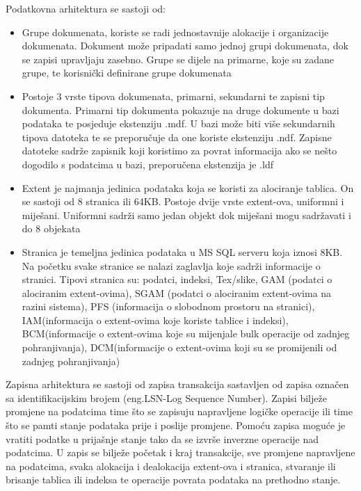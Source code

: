 \documentclass[12pt, oneside, onecolumn]{book}
\begin{document}
{Podatkovna arhitektura se sastoji od:

\begin{itemize}
\item Grupe dokumenata, koriste se radi jednostavnije alokacije i organizacije dokumenata. Dokument može pripadati samo jednoj grupi dokumenata, dok se zapisi upravljaju zasebno. Grupe se dijele na primarne, koje su zadane grupe, te korisnički definirane grupe dokumenata
\item Postoje 3 vrste tipova dokumenata, primarni, sekundarni te zapisni tip dokumenta. Primarni tip dokumenta pokazuje na druge dokumente u bazi podataka te posjeduje ekstenziju .mdf. U bazi može biti više sekundarnih tipova datoteka te se preporučuje da one koriste ekstenziju .ndf. Zapisne datoteke sadrže zapisnik koji koristimo za povrat informacija ako se nešto dogodilo s podatcima u bazi, preporučena ekstenzija je .ldf
\item Extent je najmanja jedinica podataka koja se koristi za alociranje tablica. On se sastoji od 8 stranica ili 64KB. Postoje dvije vrste extent-ova, uniformni i miješani. Uniformni sadrži samo jedan objekt dok miješani mogu sadržavati i do 8 objekata
\item Stranica je temeljna jedinica podataka u MS SQL serveru koja iznosi 8KB. Na početku svake stranice se nalazi zaglavlja koje sadrži informacije o stranici. Tipovi stranica su: podatci, indeksi, Tex/slike, GAM (podatci o alociranim extent-ovima), SGAM (podatci o alociranim extent-ovima na razini sistema), PFS (informacija o slobodnom prostoru na stranici), IAM(informacija o extent-ovima koje koriste tablice i indeksi), BCM(informacije o extent-ovima koje su mijenjale bulk operacije od zadnjeg pohranjivanja), DCM(informacije o extent-ovima koji su se promijenili od zadnjeg pohranjivanja) 
\end{itemize}

Zapisna arhitektura se sastoji od zapisa transakcija sastavljen od zapisa označen sa identifikacijskim brojem (eng.LSN-Log Sequence Number). Zapisi bilježe promjene na podatcima time što se zapisuju napravljene logičke operacije ili time što se pamti stanje podataka prije i poslije promjene. Pomoću zapisa moguće je vratiti podatke u prijašnje stanje tako da se izvrše inverzne operacije nad podatcima. U zapis se bilježe početak i kraj transakcije, sve promjene napravljene na podatcima, svaka alokacija i dealokacija extent-ova i stranica, stvaranje ili brisanje tablica ili indeksa te operacije povrata podataka na prethodno stanje. 

}
\end{document}
